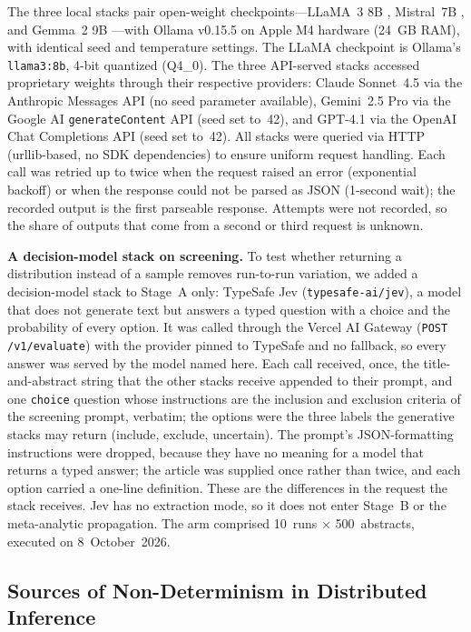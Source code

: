 \documentclass[preprint,review,12pt,authoryear]{elsarticle}
\begin{document}
\noindent The three local stacks pair open-weight checkpoints---LLaMA~3 8B \citep{dubey2024llama3}, Mistral~7B \citep{jiang2023mistral}, and Gemma~2 9B \citep{team2024gemma}---with Ollama v0.15.5 on Apple M4 hardware (24~GB RAM), with identical seed and temperature settings. The LLaMA checkpoint is Ollama's \texttt{llama3:8b}, 4-bit quantized (Q4\_0).
The three API-served stacks accessed proprietary weights through their respective providers: Claude Sonnet~4.5 \citep{anthropic2025sonnet45} via the Anthropic Messages API (no seed parameter available), Gemini~2.5 Pro \citep{geminiteam2024gemini} via the Google AI \texttt{generateContent} API (seed set to~42), and GPT-4.1 \citep{openai2025gpt41} via the OpenAI Chat Completions API (seed set to~42).
All stacks were queried via HTTP (urllib-based, no SDK dependencies) to ensure uniform request handling.
Each call was retried up to twice when the request raised an error (exponential backoff) or when the response could not be parsed as JSON (1-second wait); the recorded output is the first parseable response. Attempts were not recorded, so the share of outputs that come from a second or third request is unknown.

\textbf{A decision-model stack on screening.}
To test whether returning a distribution instead of a sample removes run-to-run variation, we added a decision-model stack to Stage~A only: TypeSafe Jev (\texttt{typesafe-ai/jev}), a model that does not generate text but answers a typed question with a choice and the probability of every option.
It was called through the Vercel AI Gateway (\texttt{POST /v1/evaluate}) with the provider pinned to TypeSafe and no fallback, so every answer was served by the model named here.
Each call received, once, the title-and-abstract string that the other stacks receive appended to their prompt, and one \texttt{choice} question whose instructions are the inclusion and exclusion criteria of the screening prompt, verbatim; the options were the three labels the generative stacks may return (include, exclude, uncertain).
The prompt's JSON-formatting instructions were dropped, because they have no meaning for a model that returns a typed answer; the article was supplied once rather than twice, and each option carried a one-line definition. These are the differences in the request the stack receives.
Jev has no extraction mode, so it does not enter Stage~B or the meta-analytic propagation.
The arm comprised 10~runs $\times$ 500~abstracts, executed on 8~October~2026.

\subsection{Sources of Non-Determinism in Distributed Inference}
\label{sec:mechanisms}
\end{document}
